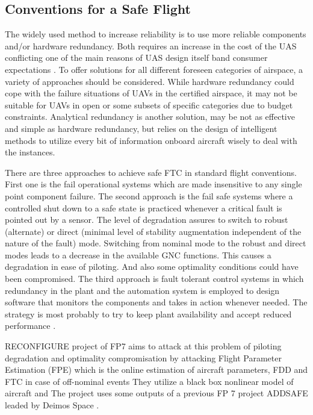 \subsection{Conventions for a Safe Flight}\label{ch2:conventions}

The widely used method to increase reliability is to use more reliable components and/or hardware redundancy. 
Both requires an increase in the cost of the UAS conflicting one of the main reasons of UAS design itself band consumer expectations 
\cite{angelov2012sense}. To offer solutions for all different foreseen categories of 
airspace, a variety of approaches should be considered. While hardware redundancy 
could cope with the failure situations of UAVs in the certified airspace, it may not be 
suitable for UAVs in open or some subsets of specific categories due to budget 
constraints. Analytical redundancy is another solution, may be not as effective and 
simple as hardware redundancy, but relies on the design of intelligent methods to 
utilize every bit of information onboard aircraft wisely to deal with the instances.  

There are three approaches to achieve safe FTC in standard flight conventions. 
First one is the fail operational systems which are made insensitive to any single 
point component failure. The second approach is the fail safe systems where a 
controlled shut down to a safe state is practiced whenever a critical fault is pointed 
out by a sensor. The level of degradation assures to switch to robust (alternate) or 
direct (minimal level of stability augmentation independent of the nature of the fault) mode. 
Switching from nominal mode to the robust and direct modes leads to a decrease 
in the available GNC functions. This causes a degradation in ease of piloting. And 
also some optimality conditions could have been compromised. The third approach 
is fault tolerant control systems in which redundancy in the plant and the automation 
system is employed to design software that monitors the components and takes in 
action whenever needed. The strategy is most probably to try to keep plant availability 
and accept reduced performance \cite{blanke2000fault}.

RECONFIGURE project of FP7 \cite{goupil2015overview} aims to attack at this 
problem of piloting degradation and optimality compromisation by attacking 
Flight Parameter Estimation (FPE) which is the online estimation of aircraft parameters, 
FDD and FTC in case of off-nominal events \cite{RECONFIGURE} They utilize a black 
box nonlinear model of aircraft and The project uses some outputs of a previous FP 7 
project ADDSAFE leaded by Deimos Space \cite{ADDSAFE}.

